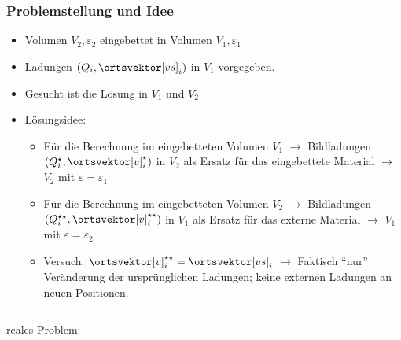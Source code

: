 \begin{frame}
  \frametitle{Problemstellung und Idee}
  \begin{itemize}[<+->]
  \item Volumen $V_2, \varepsilon_2$ eingebettet in Volumen $V_1,\varepsilon_1$
  \item Ladungen $(Q_i, \ortsvektor[vs]_i)$ in $V_1$ vorgegeben.
  \item Gesucht ist die Lösung in $V_1$ \alert{und} $V_2$
  \item Lösungsidee:
    \begin{itemize}[<+->]
    \item Für die Berechnung im eingebetteten Volumen $V_1$ $\to$ Bildladungen $(Q_i^\star, \ortsvektor[v]_i^\star)$ in $V_2$ als Ersatz für das eingebettete Material $\to$ $V_2$ mit $\varepsilon = \varepsilon_1$
    \item Für die Berechnung im eingebetteten Volumen $V_2$ $\to$ Bildladungen $(Q_i^{\star\star}, \ortsvektor[v]_i^{\star\star})$ in $V_1$ als Ersatz für das externe Material $\to$ $V_1$ mit $\varepsilon = \varepsilon_2$
      \item Versuch: $\ortsvektor[v]_i^{\star\star} = \ortsvektor[vs]_i$ $\to$ Faktisch \enquote{nur} Veränderung der ursprünglichen Ladungen; keine externen Ladungen an neuen Positionen.
      \end{itemize}
    \end{itemize}
    \pause
    \begin{columns}
      \begin{column}{.3\textwidth}
      reales Problem:

      
        

\end{column}
\end{columns}
\end{frame}
